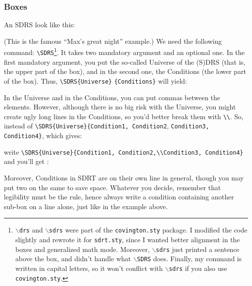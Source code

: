 \documentclass[a4paper]{article}
\begin{document}
\subsubsection{Boxes}
An SDRS look like this: 
\begin{center}
\end{center}
(This is the famous ``Max's great night'' example.) We need the following command: \verb+\SDRS+\footnote{\texttt{$\backslash$drs} and \texttt{$\backslash$sdrs} were part of the \texttt{covington.sty} package. I modified the code slightly and rewrote it for \texttt{sdrt.sty}, since I wanted better alignment in the boxes and generalized math mode. Moreover, \texttt{$\backslash$sdrs} just printed a sentence above the box, and didn't handle what \texttt{$\backslash$SDRS} does. Finally, my command is written in capital letters, so it won't conflict with \texttt{$\backslash$sdrs} if you also use \texttt{covington.sty}.}. It takes two mandatory argument and an optional one. In the first mandatory argument, you put the so-called Universe of the (S)DRS (that is, the upper part of the box), and in the second one, the Conditions (the lower part of the box). Thus, \verb+\SDRS{Universe}+ \verb+{Conditions}+ will yield:
\begin{center}
\end{center}
In the Universe and in the Conditions, you can put commas between the elements. However, although there is no big risk with the Universe, you might create ugly long lines in the Conditions, so you'd better break them with \verb+\\+. So, instead of \verb+\SDRS{Universe}+\verb+{Condition1, Condition2+, \verb+Condition3, Condition4}+, which gives:
\begin{center}
\end{center}
write \verb+\SDRS{Universe}+\verb+{Condition1, Condition2,\\+\verb+Condition3, Condition4}+ and you'll get :
\begin{center}
\end{center}
Moreover, Conditions in SDRT are on their own line in general, though you may put two on the same to save space. Whatever you decide, remember that legibility must be the rule, hence always write a condition containing another sub-box on a line alone, just like in the example above.
\end{document}
